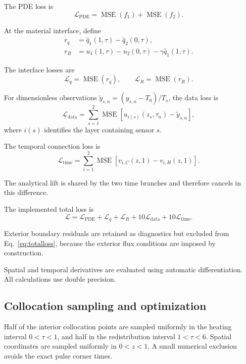 \documentclass[11pt,a4paper]{article}
\newcommand{\MSE}{\operatorname{MSE}}
\begin{document}
The PDE loss is
\begin{equation}
\mathcal{L}_{\mathrm{PDE}}
=
\MSE(f_1)+\MSE(f_2).
\end{equation}

At the material interface, define
\begin{align}
r_q&=\widehat q_1(1,\tau)-\widehat q_2(0,\tau),\\
r_R&=u_1(1,\tau)-u_2(0,\tau)
-\gamma\widehat q_1(1,\tau).
\end{align}

The interface losses are
\begin{equation}
\mathcal{L}_q=\MSE(r_q),
\qquad
\mathcal{L}_R=\MSE(r_R).
\end{equation}

For dimensionless observations
$\widetilde y_{s,n}=(y_{s,n}-T_0)/T_s$, the data loss is
\begin{equation}
\mathcal{L}_{\mathrm{data}}
=
\sum_{s=1}^{2}
\MSE\left[
u_{i(s)}(z_s,\tau_n)-\widetilde y_{s,n}
\right],
\end{equation}
where $i(s)$ identifies the layer containing sensor $s$.

The temporal connection loss is
\begin{equation}
\mathcal{L}_{\mathrm{time}}
=
\sum_{i=1}^{2}
\MSE\left[
v_{i,C}(z,1)-v_{i,H}(z,1)
\right].
\end{equation}

The analytical lift is shared by the two time branches and
therefore cancels in this difference.

The implemented total loss is
\begin{equation}
\mathcal{L}
=
\mathcal{L}_{\mathrm{PDE}}
+\mathcal{L}_q
+\mathcal{L}_R
+10\mathcal{L}_{\mathrm{data}}
+10\mathcal{L}_{\mathrm{time}}.
\label{eq:totalloss}
\end{equation}

Exterior boundary residuals are retained as diagnostics but
excluded from Eq.~\eqref{eq:totalloss}, because the exterior
flux conditions are imposed by construction.

Spatial and temporal derivatives are evaluated using
automatic differentiation.
All calculations use double precision.

\subsection{Collocation sampling and optimization}

Half of the interior collocation points are sampled uniformly
in the heating interval $0<\tau<1$, and half in the
redistribution interval $1<\tau<6$.
Spatial coordinates are sampled uniformly in $0<z<1$.
A small numerical exclusion avoids the exact pulse corner
times.
\end{document}
